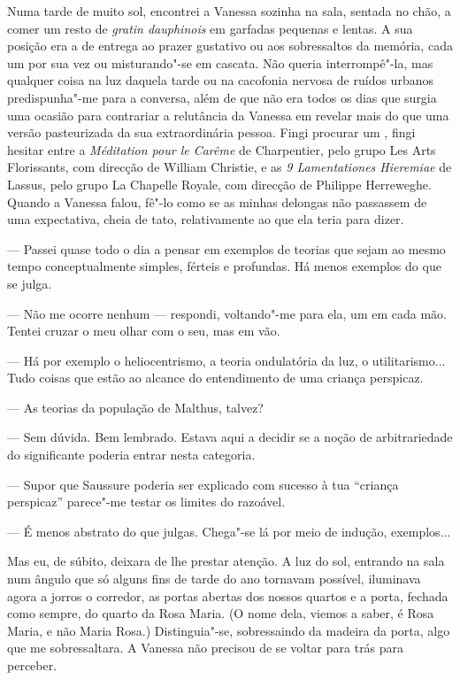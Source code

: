 Numa tarde de muito sol, encontrei a Vanessa sozinha na sala, sentada no
chão, a comer um resto de \emph{gratin dauphinois }em garfadas pequenas
e lentas. A sua posição era a de entrega ao prazer gustativo ou aos
sobressaltos da memória, cada um por sua vez ou misturando"-se em
cascata. Não queria interrompê"-la, mas qualquer coisa na luz daquela tarde ou na cacofonia nervosa de
ruídos urbanos predispunha"-me para a conversa, além de que não era todos
os dias que surgia uma ocasião para contrariar a relutância da Vanessa
em revelar mais do que uma versão pasteurizada da sua extraordinária
pessoa. Fingi procurar um , fingi hesitar entre a \emph{Méditation
pour le Carême }de Charpentier, pelo grupo Les Arts Florissants, com
direcção de William Christie, e as \emph{9 Lamentationes Hieremiae }de
Lassus, pelo grupo La Chapelle Royale, com direcção de Philippe
Herreweghe. Quando a Vanessa falou, fê"-lo como se
as minhas delongas não passassem de uma expectativa, cheia de tato,
relativamente ao que ela teria para dizer.

--- Passei quase todo o dia a pensar em exemplos de teorias que sejam ao
  mesmo tempo conceptualmente simples, férteis e profundas. Há menos
  exemplos do que se julga.

--- Não me ocorre nenhum --- respondi, voltando"-me para ela, um  em cada
  mão. Tentei cruzar o meu olhar com o seu, mas em vão.

--- Há por exemplo o heliocentrismo, a teoria ondulatória da luz, o
  utilitarismo... Tudo coisas que estão ao alcance do entendimento de
  uma criança perspicaz.

--- As teorias da população de Malthus, talvez?

--- Sem dúvida. Bem lembrado. Estava aqui a decidir se a noção de
  arbitrariedade do significante poderia entrar nesta categoria.

--- Supor que Saussure poderia ser explicado com sucesso à tua ``criança
  perspicaz'' parece"-me testar os limites do razoável.

--- É menos abstrato do que julgas. Chega"-se lá por meio de indução,
  exemplos...


Mas eu, de súbito, deixara de lhe prestar atenção. A luz do sol,
entrando na sala num ângulo que só alguns fins de tarde do ano tornavam
possível, iluminava agora a jorros o corredor, as portas abertas dos
nossos quartos e a porta, fechada como sempre, do quarto da Rosa Maria.
(O nome dela, viemos a saber, é Rosa Maria, e não Maria Rosa.)
Distinguia"-se, sobressaindo da madeira da porta, algo que me
sobressaltara. A Vanessa não precisou de se voltar para trás para
perceber.

